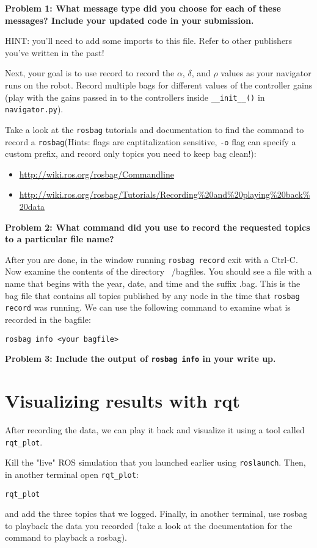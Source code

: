 \documentclass{article}
\begin{document}
\textbf{Problem 1: What message type did you choose for each of these messages? Include your updated code in your submission.}

HINT: you'll need to add some imports to this file. Refer to other publishers you've written in the past!

Next, your goal is to use record to record the $\alpha$, $\delta$, and $\rho$ values as your navigator runs on the robot. 
Record multiple bags for different values of the controller gains (play with the gains passed in to the controllers inside \texttt{\_\_init\_\_()} in \texttt{navigator.py}).

Take a look at the 
\texttt{rosbag} tutorials and documentation to find the command to record a \texttt{rosbag}(Hints: flags are captitalization sensitive, \texttt{-o} flag can specify a custom prefix, and record only topics you need to keep bag clean!):
\begin{itemize}
    \item \url{http://wiki.ros.org/rosbag/Commandline}
    \item \url{http://wiki.ros.org/rosbag/Tutorials/Recording\%20and\%20playing\%20back\%20data}
\end{itemize}

\textbf{Problem 2: What command did you use to record the requested topics to a particular file name?}

After you are done, in the window  running \texttt{rosbag record} exit with a Ctrl-C. Now examine the contents of the directory ~/bagfiles. You should see a file with a name that begins with the year, date, and time and the suffix .bag. This is the bag file that contains all topics published by any node in the time that \texttt{rosbag record} was running.
We can use the following command to examine what is recorded in the bagfile:
\begin{lstlisting}
rosbag info <your bagfile>
\end{lstlisting}

\textbf{Problem 3: Include the output of \texttt{rosbag info} in your write up.}
\section{Visualizing results with rqt}
After recording the data, we can play it back and visualize it using a tool called \texttt{rqt\_plot}. 

Kill the "live" ROS simulation that you launched earlier using \texttt{roslaunch}. 
Then, in another terminal open \texttt{rqt\_plot}:
\begin{lstlisting}
rqt_plot
\end{lstlisting}
and add the three topics that we logged. 
Finally, in another terminal, use rosbag to playback the data you recorded (take a look at the documentation for the command to playback a rosbag).
\end{document}
